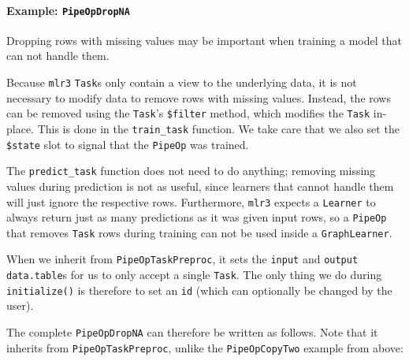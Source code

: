 \documentclass[]{article}
\let\oldparagraph\paragraph
\renewcommand{\paragraph}[1]{\oldparagraph{#1}\mbox{}}
\begin{document}
\hypertarget{example-pipeopdropna}{%
\paragraph{\texorpdfstring{Example: \texttt{PipeOpDropNA}}{Example: PipeOpDropNA}}\label{example-pipeopdropna}}

Dropping rows with missing values may be important when training a model that can not handle them.

Because \texttt{mlr3} \texttt{Task}s only contain a view to the underlying data, it is not necessary to modify data to remove rows with missing values.
Instead, the rows can be removed using the \texttt{Task}'s \texttt{\$filter} method, which modifies the \texttt{Task} in-place.
This is done in the \texttt{train\_task} function. We take care that we also set the \texttt{\$state} slot to signal that the \texttt{PipeOp} was trained.

The \texttt{predict\_task} function does not need to do anything; removing missing values during prediction is not as useful, since learners that cannot handle them will just ignore the respective rows.
Furthermore, \texttt{mlr3} expects a \texttt{Learner} to always return just as many predictions as it was given input rows, so a \texttt{PipeOp} that removes \texttt{Task} rows during training can not be used inside a \texttt{GraphLearner}.

When we inherit from \texttt{PipeOpTaskPreproc}, it sets the \texttt{input} and \texttt{output} \texttt{data.table}s for us to only accept a single \texttt{Task}.
The only thing we do during \texttt{initialize()} is therefore to set an \texttt{id} (which can optionally be changed by the user).

The complete \texttt{PipeOpDropNA} can therefore be written as follows.
Note that it inherits from \texttt{PipeOpTaskPreproc}, unlike the \texttt{PipeOpCopyTwo} example from above:
\end{document}
